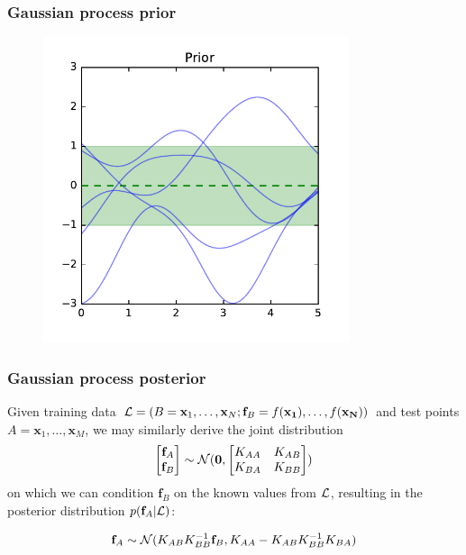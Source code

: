 \documentclass{beamer}
\begin{document}
\begin{frame}
    \frametitle{Gaussian process prior}

    \begin{figure}
    \includegraphics[width=0.8\textwidth]{./figures/gp-prior.pdf}
    \end{figure}

\end{frame}

\begin{frame}
    \frametitle{Gaussian process posterior}

    Given training data ${\cal L} = (B = \mathbf{x}_1, \dots, \mathbf{x}_N; \mathbf{f}_B = f(\mathbf{x_1}), \dots, f(\mathbf{x_N} ))$
    and test points $A = \mathbf{x}_1, \dots,
    \mathbf{x}_M$, we may similarly derive the joint distribution
    $$\begin{bmatrix}\mathbf{f}_A\\
                     \mathbf{f}_B\end{bmatrix} \sim {\cal N}(\mathbf{0}, \begin{bmatrix}K_{AA} & K_{AB} \\
                                                                                        K_{BA} & K_{BB}\end{bmatrix})$$
    on which we can condition $\mathbf{f}_B$ on the known values from ${\cal L}$,
    resulting in the posterior distribution $p(\mathbf{f}_A|{\cal L})$:

    $$\mathbf{f}_A \sim {\cal N}(K_{AB}K_{BB}^{-1}{\mathbf{f}_B}, K_{AA} - K_{AB}K_{BB}^{-1}K_{BA})$$

\end{frame}
\end{document}
